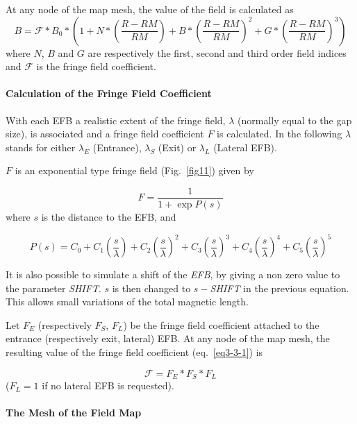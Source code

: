 \noindent At  any node  of the map mesh, the value of the field is calculated as 
 \begin{equation}
	 B =  \mathcal{F} \ast  B_0 \ast  
	      \left(1+N \ast  
	           \left( \frac{R-RM }{ RM}\right) 
	           + B \ast  \left(\frac{R-RM }{ RM} \right)^2 
	           + G \ast  \left(\frac{R-RM }{ RM} \right)^3 
	      \right) 
 	\label{eq3-3-1}
 \end{equation}
%
 where  $ N$, $B $ and $ G $ are  respectively  the first, second and
third order field indices and $ \mathcal{F}$ is the fringe field coefficient. 


\paragraph{Calculation of the Fringe Field Coefficient} 

\noindent With  each EFB a realistic extent of the fringe field, $\lambda $ 
(normally equal to the gap size), is associated and a fringe field coefficient
$ F $ is calculated. In the following $\lambda$ stands for either $ \lambda_ E $
(Entrance), $ \lambda_ S $ (Exit) or $ \lambda_ L $ (Lateral EFB).  
\bigskip

\noindent$ F $ is an exponential type fringe field (Fig.~\ref{fig11}) 
given by~\cite{Biblio12}     %

$$ F = \frac{1 }{ 1+ \exp P(s)} $$
%
 where $ s $ is the distance to the EFB, and 

$$
    P(s) = C_0
       +C_1 \left(  \dfrac{s }{ \lambda} \right) 
       +C_2 \left( \dfrac{s }{ \lambda} \right)^2 
       + C_3 \left( \dfrac{s }{ \lambda} \right)^3 
       +C_4 \left( \dfrac{s }{ \lambda} \right)^4 
       + C_5 \left(\dfrac{s }{ \lambda} \right)^5 $$
       
\noindent It is also possible to simulate a shift of the \textsl{EFB}, by giving a non
zero value to the parameter \textsl{SHIFT}.  $ s $ is then changed to $ s -$\textsl{SHIFT} in the 
previous equation.   This allows small variations of the total magnetic length.  
\bigskip

\noindent Let $ F_E $ (respectively $ F_S$, $F_L$)  be the fringe field
coefficient attached to the entrance (respectively exit, lateral) EFB. At any node of the map 
mesh, the resulting value of the fringe field coefficient (eq.~\ref{eq3-3-1}) is

$$  \mathcal{F} = F_E  \ast  F_S \ast   F_L $$
%
($F_L=1 $ if no lateral EFB is requested). 

\paragraph{The Mesh of the Field Map} 

